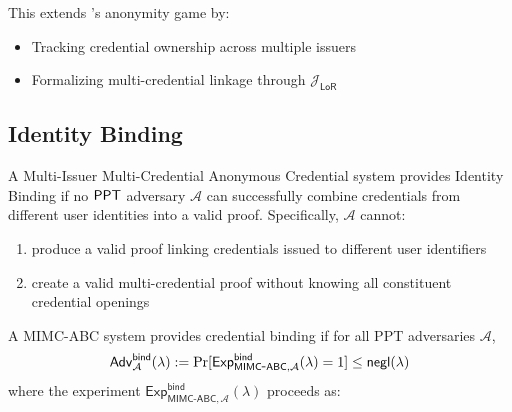\begin{remark}
This extends \cite{fuchsbauer_structure-preserving_2019}'s anonymity game by:
\begin{itemize}
    \item Tracking credential ownership across multiple issuers
    \item Formalizing multi-credential linkage through $\mathcal{J}_{\mathsf{LoR}}$
\end{itemize}
\end{remark}

























\newpage
\subsection{Identity Binding} 
\begin{definition}
A Multi-Issuer Multi-Credential Anonymous Credential system provides Identity Binding if no $\mathsf{PPT}$ adversary $\mathcal{A}$ can successfully combine credentials from different user identities into a valid proof. Specifically, $\mathcal{A}$ cannot:
\begin{enumerate}
    \item produce a valid proof linking credentials issued to different user identifiers
    \item create a valid multi-credential proof without knowing all constituent credential openings
\end{enumerate}

A MIMC-ABC system provides credential binding if for all PPT adversaries $\mathcal{A}$,
\[
\mathsf{Adv}^{\mathsf{bind}}_{\mathcal{A}}(\lambda) := \Pr[\mathsf{Exp}^{\mathsf{bind}}_{\mathsf{MIMC\mbox{-}ABC},\mathcal{A}}(\lambda)=1] \leq {\mathsf{negl}(\lambda)}
\]
where the experiment $\mathsf{Exp}^{\mathsf{bind}}_{\mathsf{MIMC\mbox{-}ABC},\mathcal{A}}(\lambda)$ proceeds as:
\end{definition}

